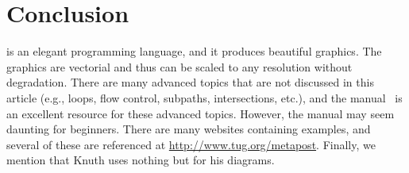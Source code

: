 \section{Conclusion}
\label{sec:conclusion}

\MP{} is an elegant programming language, and it produces beautiful
graphics.  The graphics are vectorial and thus can be scaled to any
resolution without degradation.  There are many advanced topics that are
not discussed in this article (e.g., loops, flow control, subpaths,
intersections, etc.), and the \MP{} manual~\cite{hobby:user} is an
excellent resource for these advanced topics.  However, the \MP{} manual
may seem daunting for beginners.  There are many websites containing
\MP{} examples, and several of these are referenced at
\url{http://www.tug.org/metapost}.  Finally, we mention that Knuth uses
nothing but \MP{} for his diagrams.
